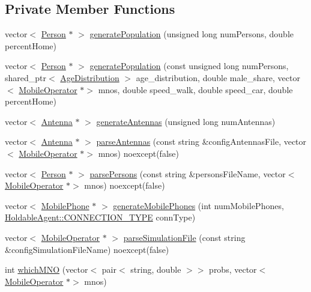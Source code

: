 \subsection*{Private Member Functions}
\begin{DoxyCompactItemize}
\item 
vector$<$ \hyperlink{class_person}{Person} $\ast$ $>$ \hyperlink{class_world_ada780d7d546a1dad038c83aad3f696df}{generate\+Population} (unsigned long num\+Persons, double percent\+Home)
\item 
vector$<$ \hyperlink{class_person}{Person} $\ast$ $>$ \hyperlink{class_world_aab92523ca0922b67e4ec77f37939edc1}{generate\+Population} (const unsigned long num\+Persons, shared\+\_\+ptr$<$ \hyperlink{class_age_distribution}{Age\+Distribution} $>$ age\+\_\+distribution, double male\+\_\+share, vector$<$ \hyperlink{class_mobile_operator}{Mobile\+Operator} $\ast$$>$ mnos, double speed\+\_\+walk, double speed\+\_\+car, double percent\+Home)
\item 
vector$<$ \hyperlink{class_antenna}{Antenna} $\ast$ $>$ \hyperlink{class_world_adbd58c8093be1ac349d929d9a4bc2ab0}{generate\+Antennas} (unsigned long num\+Antennas)
\item 
vector$<$ \hyperlink{class_antenna}{Antenna} $\ast$ $>$ \hyperlink{class_world_aebe7c211a9ddae90773f6ec880cdca15}{parse\+Antennas} (const string \&config\+Antennas\+File, vector$<$ \hyperlink{class_mobile_operator}{Mobile\+Operator} $\ast$$>$ mnos) noexcept(false)
\item 
vector$<$ \hyperlink{class_person}{Person} $\ast$ $>$ \hyperlink{class_world_a70efdf2e1864a9711b168d0677179b34}{parse\+Persons} (const string \&persons\+File\+Name, vector$<$ \hyperlink{class_mobile_operator}{Mobile\+Operator} $\ast$$>$ mnos) noexcept(false)
\item 
vector$<$ \hyperlink{class_mobile_phone}{Mobile\+Phone} $\ast$ $>$ \hyperlink{class_world_a9ba6bd08d85c5f610ea30bf4f74b925d}{generate\+Mobile\+Phones} (int num\+Mobile\+Phones, \hyperlink{class_holdable_agent_ae2c334b004d7b9c5a999cf2618e4e518}{Holdable\+Agent\+::\+C\+O\+N\+N\+E\+C\+T\+I\+O\+N\+\_\+\+T\+Y\+PE} conn\+Type)
\item 
vector$<$ \hyperlink{class_mobile_operator}{Mobile\+Operator} $\ast$ $>$ \hyperlink{class_world_adef43cc4ccb918aa68c00ee1e3286321}{parse\+Simulation\+File} (const string \&config\+Simulation\+File\+Name) noexcept(false)
\item 
int \hyperlink{class_world_a9a982977a44c9e8a4724eaa1e4108679}{which\+M\+NO} (vector$<$ pair$<$ string, double $>$$>$ probs, vector$<$ \hyperlink{class_mobile_operator}{Mobile\+Operator} $\ast$$>$ mnos)
$$
\end{DoxyCompactItemize}
